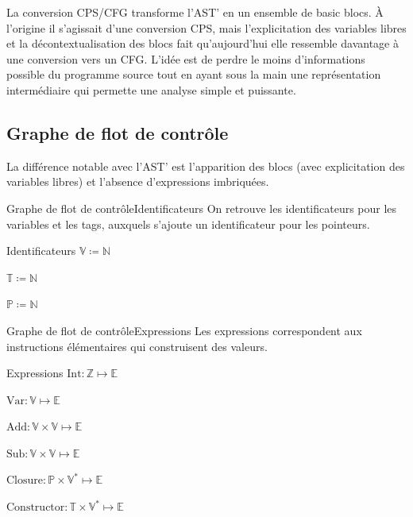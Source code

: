 \documentclass{beamer}
\begin{document}
La conversion CPS/CFG transforme l'AST' en un ensemble de basic blocs. À l'origine il s'agissait d'une conversion CPS, mais l'explicitation des variables libres et la décontextualisation des blocs fait qu'aujourd'hui elle ressemble davantage à une conversion vers un CFG. L'idée est de perdre le moins d'informations possible du programme source tout en ayant sous la main une représentation intermédiaire qui permette une analyse simple et puissante.

\subsection{Graphe de flot de contrôle}

La différence notable avec l'AST' est l'apparition des blocs (avec explicitation des variables libres) et l'absence d'expressions imbriquées.

\begin{frame}{Graphe de flot de contrôle}{Identificateurs}
    On retrouve les identificateurs pour les variables et les tags, auxquels s'ajoute un identificateur pour les pointeurs.
    
    \begin{block}{Identificateurs}
        $\mathbb{V} \coloneqq \mathbb{N}$%

        $\mathbb{T} \coloneqq \mathbb{N}$%

        $\mathbb{P} \coloneqq \mathbb{N}$%
    \end{block}
\end{frame}

\begin{frame}{Graphe de flot de contrôle}{Expressions}
    Les expressions correspondent aux instructions élémentaires qui construisent des valeurs.
    
    \begin{block}{Expressions}
        $\text{Int} : \mathbb{Z} \mapsto \mathbb{E}$%

        $\text{Var} : \mathbb{V} \mapsto \mathbb{E}$%

        $\text{Add} : \mathbb{V} \times \mathbb{V} \mapsto \mathbb{E}$%

        $\text{Sub} : \mathbb{V} \times \mathbb{V} \mapsto \mathbb{E}$%

        $\text{Closure} : \mathbb{P} \times \mathbb{V}^{*} \mapsto \mathbb{E}$%

        $\text{Constructor} : \mathbb{T} \times \mathbb{V}^{*} \mapsto \mathbb{E}$%
    \end{block}
\end{frame}
\end{document}
